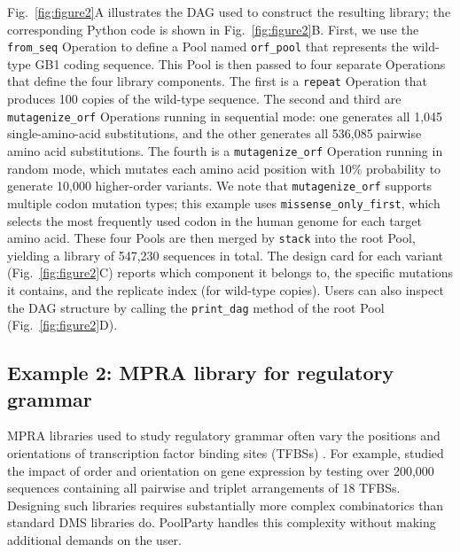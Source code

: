 \documentclass[pdflatex,sn-vancouver-num,referee,oneside]{sn-jnl}
\newif\ifshowquoted
\newcommand{\quoted}[1]{\ifshowquoted\textcolor{quotedtext}{#1}\else#1\fi}
\begin{document}
Fig.~\ref{fig:figure2}A illustrates the DAG used to construct the resulting library; the corresponding Python code is shown in Fig.~\ref{fig:figure2}B. First, we use the \texttt{from\_seq} Operation to define a Pool named \texttt{orf\_pool} that represents the wild-type GB1 coding sequence. This Pool is then passed to four separate Operations that define the four library components. The first is a \texttt{repeat} Operation that produces 100 copies of the wild-type sequence. The second and third are \texttt{mutagenize\_orf} Operations running in sequential mode: one generates all 1,045 single-amino-acid substitutions, and the other generates all 536,085 pairwise amino acid substitutions. The fourth is a \texttt{mutagenize\_orf} Operation running in random mode, which mutates each amino acid position with 10\% probability to generate 10,000 higher-order variants. \quoted{We note that \texttt{mutagenize\_orf} supports multiple codon mutation types; this example uses \texttt{missense\_only\_first}, which selects the most frequently used codon in the human genome for each target amino acid.} These four Pools are then merged by \texttt{stack} into the root Pool, yielding a library of 547,230 sequences in total. The design card for each variant (Fig.~\ref{fig:figure2}C) reports which component it belongs to, the specific mutations it contains, and the replicate index (for wild-type copies). Users can also inspect the DAG structure by calling the \texttt{print\_dag} method of the root Pool (Fig.~\ref{fig:figure2}D).

\subsection*{Example 2: MPRA library for regulatory grammar}\label{subsec:example2-mpra}

MPRA libraries used to study regulatory grammar often vary the positions and orientations of transcription factor binding sites (TFBSs) \citep{Melnikov2012dw, Sharon2012io, King2020aa, Smith2013kn, Grossman2017aa, WeingartenGabbay2019bl, GeorgakopoulosSoares2023tf}. For example, \citet{GeorgakopoulosSoares2023tf} studied the impact of order and orientation on gene expression by testing over 200,000 sequences containing all pairwise and triplet arrangements of 18 TFBSs. Designing such libraries requires substantially more complex combinatorics than standard DMS libraries do. PoolParty handles this complexity without making additional demands on the user.
\end{document}
